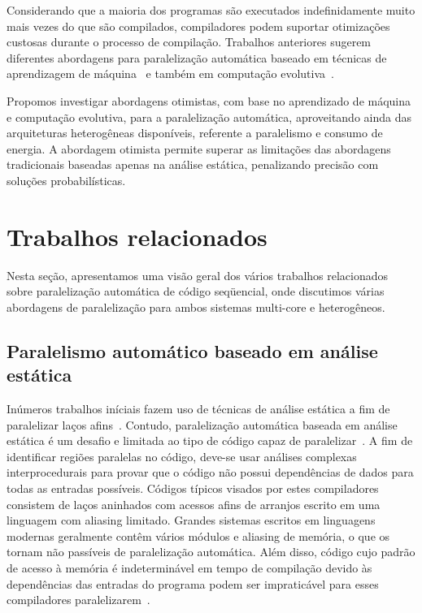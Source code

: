 \documentclass[a4paper,12pt]{article}
\begin{document}
Considerando que a maioria dos programas são executados indefinidamente muito mais vezes do que são compilados, compiladores podem suportar otimizações custosas durante o processo de compilação. Trabalhos anteriores sugerem diferentes abordagens para paralelização automática baseado em técnicas de aprendizagem de máquina~\cite{tournavitis09,wang14a} e também em computação evolutiva~\cite{walsh95,walsh96,williams96,williams99}.

Propomos investigar abordagens otimistas, com base no aprendizado de máquina e computação evolutiva, para a paralelização automática, aproveitando ainda das arquiteturas heterogêneas disponíveis, referente a paralelismo e consumo de energia. A abordagem otimista permite superar as limitações das abordagens tradicionais baseadas apenas na análise estática, penalizando precisão com soluções probabilísticas.

\section{Trabalhos relacionados}

Nesta seção, apresentamos uma visão geral dos vários trabalhos relacionados sobre paralelização automática de código seqüencial, onde discutimos várias abordagens de paralelização para ambos sistemas multi-core e heterogêneos.

\subsection{Paralelismo automático baseado em análise estática}

Inúmeros trabalhos iníciais fazem uso de técnicas de análise estática a fim de paralelizar laços afins~\cite{kuck81,padua93,blume94,lim97,bondhugula08,misailovic13}. Contudo, paralelização automática baseada em análise estática é um desafio e limitada ao tipo de código capaz de paralelizar~\cite{bruening98,kennedy01,chen03}. A fim de identificar regiões paralelas no código, deve-se usar análises complexas interprocedurais para provar que o código não possui dependências de dados para todas as entradas possíveis. Códigos típicos visados por estes compiladores consistem de laços aninhados com acessos afins de arranjos escrito em uma linguagem com aliasing limitado. Grandes sistemas escritos em linguagens modernas geralmente contêm vários módulos e aliasing de memória, o que os tornam não passíveis de paralelização automática. Além disso, código cujo padrão de acesso à memória é indeterminável em tempo de compilação devido às dependências das entradas do programa podem ser impraticável para esses compiladores paralelizarem~\cite{bruening98}.
\end{document}
